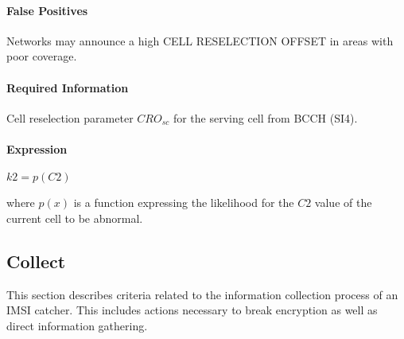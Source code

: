 \documentclass[a4paper,11pt,notitlepage,bigheadings,oneside]{scrartcl}
\begin{document}

%

\paragraph{False Positives}

Networks may announce a high CELL RESELECTION OFFSET in areas with poor
coverage.


\paragraph{Required Information}

Cell reselection parameter $CRO_{sc}$ for the serving cell from BCCH (SI4).

\paragraph{Expression}

$k2 = p(C2)$

where $p(x)$ is a function expressing the likelihood for the $C2$ value of the
current cell to be abnormal.


\subsection{Collect}

This section describes criteria related to the information collection process
of an IMSI catcher. This includes actions necessary to break encryption as well
as direct information gathering.
\end{document}
